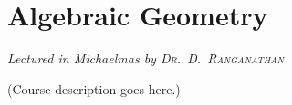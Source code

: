 \chapter[Algebraic Geometry \\ \textnormal{\emph{Lectured in Michaelmas \oldstylenums{2023} by \textsc{Dr.\ D.\ Ranganathan}}}]{Algebraic Geometry}
\emph{\Large Lectured in Michaelmas  by \textsc{Dr.\ D.\ Ranganathan}}

(Course description goes here.)


